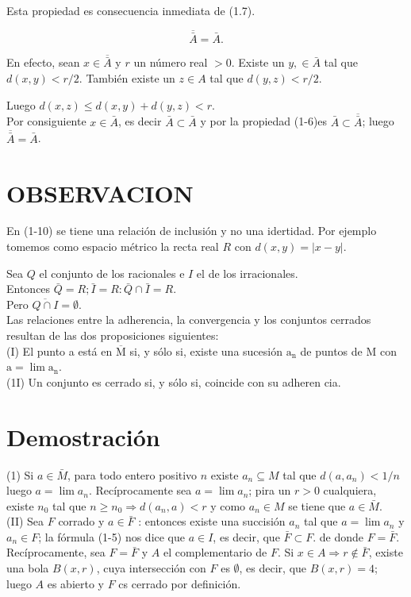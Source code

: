 \documentclass[10pt]{article}
\theoremstyle{plain}
\theoremstyle{definition}
\theoremstyle{remark}
\begin{document}
Esta propiedad es consecuencia inmediata de (1.7).


\begin{equation*}
\overline{\bar{A}}=\bar{A} . \tag{1-1}
\end{equation*}


En efecto, sean $x \in \overline{\bar{A}}$ y $r$ un número real $>0$. Existe un $y, \in \bar{A}$ tal que $d(x, y)<r / 2$. También existe un $z \in A$ tal que $d(y, z)<r / 2$.

Luego $d(x, z) \leqslant d(x, y)+d(y, z)<r$.\\
Por consiguiente $x \in \bar{A}$, es decir $\bar{A} \subset \bar{A}$ y por la propiedad (1-6)es $\bar{A} \subset \overline{\bar{A}}$; luego $\overline{\bar{A}}=\bar{A}$.

\section*{OBSERVACION}
En (1-10) se tiene una relación de inclusión y no una idertidad. Por ejemplo tomemos como espacio métrico la recta real $R$ con $d(x, y)=|x-y|$.

Sea $Q$ el conjunto de los racionales e $I$ el de los irracionales.\\
Entonces $\bar{Q}=R ; \bar{I}=R: \bar{Q} \cap \bar{I}=R$.\\
Pero $\overline{Q \cap I}=\emptyset$.\\
Las relaciones entre la adherencia, la convergencia y los conjuntos cerrados resultan de las dos proposiciones siguientes:\\
(I) El punto a está en $\overline{\mathrm{M}}$ si, y sólo si, existe una sucesión $\mathrm{a}_{\mathrm{n}}$ de puntos de M con $\mathrm{a}=\lim \mathrm{a}_{\mathrm{n}}$.\\
(1I) Un conjunto es cerrado si, y sólo si, coincide con su adheren cia.

\section*{Demostración}
(1) Si $a \in \bar{M}$, para todo entero positivo $n$ existe $a_{n} \subseteq M$ tal que $d\left(a, a_{n}\right)<1 / n$ luego $a=\lim a_{n}$. Recíprocamente sea $a=\lim a_{n}$; pira un $r>0$ cualquiera, existe $n_{0}$ tal que $n \geqslant n_{0} \Rightarrow d\left(a_{n}, a\right)<r$ y como $a_{n} \in M$ se tiene que $a \in \bar{M}$.\\
(II) Sea $F$ corrado y $a \in \bar{F}$ : entonces existe una succisión $a_{n}$ tal que $a=\lim a_{n}$ y $a_{n} \in F$; la fórmula (1-5) nos dice que $a \in I$, es decir, que $\bar{F} \subset F$. de donde $F=\bar{F}$. Recíprocamente, sea $F=\bar{F}$ y $A$ el complementario de $F$. Si $x \in A \Rightarrow r \notin \bar{F}$, existe una bola $B(x, r)$, cuya intersección con $F$ es $\emptyset$, es decir, que $B(x, r)=4$; luego $A$ es abierto y $F$ cs cerrado por definición.
\end{document}
